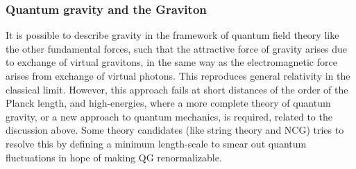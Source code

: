 
\subsubsection{Quantum gravity and the Graviton}
It is possible to describe gravity in the framework of quantum field theory like the other fundamental forces, such that the attractive force of gravity arises due to exchange of virtual gravitons, in the same way as the electromagnetic force arises from exchange of virtual photons. This reproduces general relativity in the classical limit. However, this approach fails at short distances of the order of the Planck length, and high-energies, where a more complete theory of quantum gravity, or a new approach to quantum mechanics, is required, related to the discussion above. Some theory candidates (like string theory and NCG) tries to resolve this by defining a minimum length-scale to smear out quantum fluctuations in hope of making QG renormalizable.
